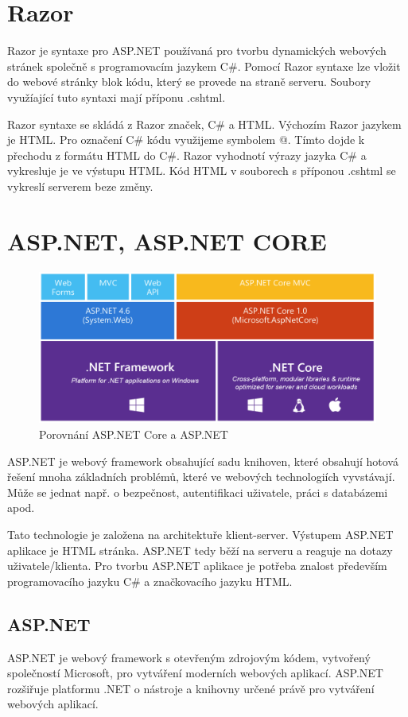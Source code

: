 \documentclass[a4paper, 12pt]{report}
\begin{document}
	\section{Razor}
	Razor je syntaxe pro ASP.NET používaná pro tvorbu dynamických webových stránek společně s programovacím jazykem C\#. Pomocí Razor syntaxe lze vložit do webové stránky blok kódu, který se provede na straně serveru. Soubory využíající tuto syntaxi mají příponu .cshtml.\par
	Razor syntaxe se skládá z Razor značek, C\# a HTML. Výchozím Razor jazykem je HTML. Pro označení C\# kódu využijeme symbolem @. Tímto dojde k přechodu z formátu HTML do C\#. Razor vyhodnotí výrazy jazyka C\# a vykresluje je ve výstupu HTML. Kód HTML v souborech s příponou .cshtml se vykreslí serverem beze změny.\cite{Razor}

	\section{ASP.NET, ASP.NET CORE}
	\begin{figure}[h!]
		\includegraphics[width=\textwidth]{aspnetcore_aspnet}
		\caption{Porovnání ASP.NET Core a ASP.NET \cite{ASPNETCORE_ASPNET}}
		\label{ASP.NET Core a ASP.NET}
	\end{figure}
	ASP.NET je webový framework obsahující sadu knihoven, které obsahují hotová řešení mnoha základních problémů, které ve webových technologiích vyvstávají. Může se jednat např. o bezpečnost, autentifikaci uživatele, práci s databázemi apod.\par
	Tato technologie je založena na architektuře klient-server. Výstupem ASP.NET aplikace je HTML stránka. ASP.NET tedy běží na serveru a reaguje na dotazy uživatele/klienta. Pro tvorbu ASP.NET aplikace je potřeba znalost především programovacího jazyku C\# a značkovacího jazyku HTML.\cite{ASP.NET_Lekce1}

	\subsection{ASP.NET}
    ASP.NET je webový framework s otevřeným zdrojovým kódem, vytvořený společností Microsoft, pro vytváření moderních webových aplikací. ASP.NET rozšiřuje platformu .NET o nástroje a knihovny určené právě pro vytváření webových aplikací.\cite{ASP.NET}
\end{document}
